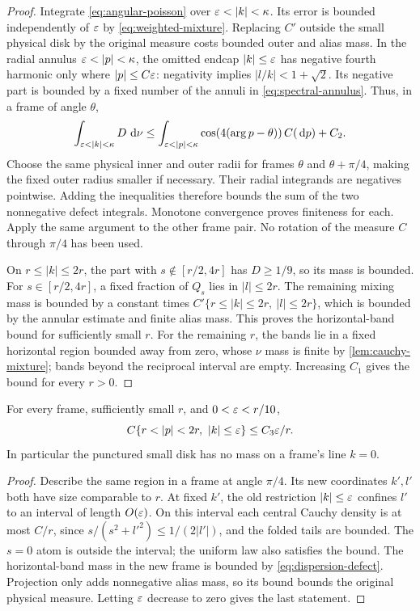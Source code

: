 \begin{proof}
Integrate \cref{eq:angular-poisson} over $\eps<|k|<\kappa$.
Its error is bounded independently of $\varepsilon$ by
\cref{eq:weighted-mixture}. Replacing $C'$ outside the small physical disk
by the original measure costs bounded outer and alias mass. In the radial
annulus $\eps<|p|<\kappa$, the omitted endcap $|k|\le\varepsilon$ has negative
fourth harmonic only where $|p|\le C\varepsilon$: negativity implies
$|l/k|<1+\sqrt2$. Its negative part is bounded by a fixed number of the
annuli in \cref{eq:spectral-annulus}. Thus, in a frame of angle $\theta$,
\begin{equation}
 \int_{\eps<|k|<\kappa}D\,\dd\nu
 \le \int_{\eps<|p|<\kappa}
        \cos(4(\arg p-\theta))\,C(\dd p)+C_2.
 \label{eq:frame-defect-bound}
\end{equation}
Choose the same physical inner and outer radii for frames $\theta$ and
$\theta+\pi/4$, making the fixed outer radius smaller if necessary.
Their radial integrands are negatives pointwise. Adding the inequalities
therefore bounds the sum of the two nonnegative defect integrals. Monotone
convergence proves finiteness for each. Apply the same argument to the other
frame pair. No rotation of the measure $C$ through $\pi/4$ has been used.

On $r\le|k|\le2r$, the part with $s\notin[r/2,4r]$ has $D\ge1/9$, so
its mass is bounded. For $s\in[r/2,4r]$, a fixed fraction of $Q_s$ lies in
$|l|\le2r$. The remaining mixing mass is bounded by a constant times
$C'\{r\le|k|\le2r,\ |l|\le2r\}$, which is bounded by the annular estimate
and finite alias mass. This proves the horizontal-band bound for sufficiently
small $r$. For the remaining $r$, the bands lie in a fixed horizontal region
bounded away from zero, whose $\nu$ mass is finite by
\cref{lem:cauchy-mixture}; bands beyond the reciprocal interval are empty.
Increasing $C_1$ gives the bound for every $r>0$.
\end{proof}

\begin{lemma}
\label{lem:spectral-endcap}
For every frame, sufficiently small $r$, and $0<\varepsilon<r/10$,
\[
 C\{r<|p|<2r,\ |k|\le\eps\}\le C_3\eps/r.
\]
In particular the punctured small disk has no mass on a frame's line $k=0$.
\end{lemma}

\begin{proof}
Describe the same region in a frame at angle $\pi/4$. Its new coordinates
$k',l'$ both have size comparable to $r$. At fixed $k'$, the old restriction
$|k|\le\varepsilon$ confines $l'$ to an interval of length $O(\varepsilon)$. On this
interval each central Cauchy density is at most $C/r$, since
$s/(s^2+l'^2)\le1/(2|l'|)$, and the folded tails are bounded.
The $s=0$ atom is outside the interval; the uniform law also satisfies the
bound. The horizontal-band mass in the new frame is bounded by
\cref{eq:dispersion-defect}. Projection only adds nonnegative alias mass,
so its bound bounds the original physical measure. Letting $\varepsilon$ decrease
to zero gives the last statement.
\end{proof}

